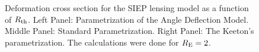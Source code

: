 \begin{figure}[!ht]
{}
\caption{\label{dcs_siep_rth} Deformation cross section for the  SIEP lensing
model as a function of $R_{\rm th}$. Left Panel:
Parametrization of the Angle Deflection Model. Middle Panel: Standard
Parametrization. Right Panel: The Keeton's parametrization. The calculations
were done for $R_{\rm E}=2$.}
\end{figure}



